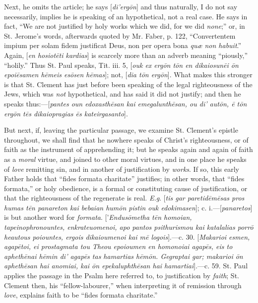 Next, he omits the article; he says [\emph{di}\emph{'}\emph{erg\={o}n}] and
thus naturally, I do not say necessarily, implies he is speaking of an
hypothetical, not a real case. He says in fact, ``We are not
justified by holy works which we did, for we did \emph{none};''
or, in St. Jerome's words, afterwards quoted by Mr. Faber, p. 122,
``Convertentem impium per solam fidem justificat Deus, non per
opera bona \emph{quæ non habuit}.'' Again, [\emph{en hosiot\={e}ti
kardias}]
is scarcely more than an adverb meaning ``piously,''
``holily.'' Thus St. Paul speaks, Tit. iii. 5, [\emph{ouk ex erg\={o}n
t\={o}n en dikaiosun\={e}i \={o}n epoi\={e}samen h\={e}meis
es\={o}sen h\={e}mas}]; not, [\emph{dia t\={o}n erg\={o}n}]. What makes this stronger is that St. Clement has just
before been speaking of the legal righteousness of the Jews, which was
\emph{not} hypothetical, and has said it did not justify; and then he speaks
thus:—[\emph{pantes oun edoxasth\={e}san kai emegalunth\={e}san,
ou di' aut\={o}n, \={e} t\={o}n erg\={o}n t\={e}s
dikaiopragias \={e}s kateirgasanto}].

But next, if, leaving the particular passage, we examine St.
Clement's epistle throughout, we shall find that he nowhere speaks of
Christ's righteousness, or of faith as the instrument of apprehending
it; but he speaks again and again of faith as a \emph{moral} virtue,
and joined to other moral virtues, and in one place he speaks of \emph{love}
remitting sin, and in another of justification by \emph{works}. If so,
this early Father holds that ``fides formata charitate''
justifies; in other words, that ``fides formata,'' or holy
obedience, is a formal or constituting cause of justification, or that
the righteousness of the regenerate is real. \emph{E.g}. [\emph{tis gar
paretid\={e}m\={e}sas pros humas t\={e}n panareton kai
bebaian hum\={o}n pistin ouk edokimasen}]; c. i.—[\emph{panaretos}]
is but another word for \emph{formata}. ['\emph{Endus\={o}metha t\={e}n
homoian, tapeinophronountes, enkrateuomenoi, apo pantos psithurismou
kai katalalias porr\={o} heautous poiountes, ergois dikaioumenoi kai
m\={e} logois}].—c. 30. [\emph{Makarioi esmen, agap\={e}toi,
ei prostagmata tou Theou epoioumen en homonoiai agap\={e}s, eis to
apheth\={e}nai h\={e}min di' agap\={e}s tas hamartias h\={e}m\={o}n.
Gegraptai gar; makarioi \={o}n apheth\={e}san hai anomiai, kai \={o}n
epekaluphth\={e}san hai hamartiai}].—c. 59. St. Paul applies the passage in the Psalm
here referred to, to justification by \emph{faith}; St. Clement then,
his ``fellow-labourer,'' when interpreting it of remission
through \emph{love}, explains faith to be ``fides formata
charitate.''

